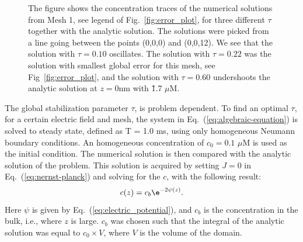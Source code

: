 \begin{figure}[b]
    \begin{minipage}[t]{\leftfigsize}
    \end{minipage}
    \hfill
    \begin{minipage}{\rightfigsize}
      \caption{The figure shows the concentration traces of the numerical solutions from Mesh 1, see legend of Fig.~\ref{fig:error_plot}, for three different $\tau$ together with the analytic solution. The solutions were picked from a line going between the points (0,0,0) and (0,0,12). We see that the solution with $\tau=0.10$ oscillates. The solution with $\tau=0.22$ was the solution with smallest global error for this mesh, see Fig~\ref{fig:error_plot}, and the solution with $\tau=0.60$ undershoots the analytic solution at $z=0$nm with \~1.7 $\mu$M.}
      \label{fig:traces_mesh_1}
    \end{minipage}
\end{figure}

The global stabilization parameter $\tau$, is problem dependent. To find an optimal $\tau$, for a certain electric field and mesh, the system in Eq.~(\ref{eq:algebraic-equation}) is solved to steady state, defined as T = 1.0 ms, using only homogeneous Neumann boundary conditions. An homogeneous concentration of $c_0=0.1$ $\mu$M is used as the initial condition. The numerical solution is then compared with the analytic solution of the problem. This solution is acquired by setting $J=0$ in Eq.~(\ref{eq:nernst-planck}) and solving for the $c$, with the following result:
\begin{equation}
  \label{eq:analytic-solution}
  c(z) = c_b\e^{-2\psi(z)}.
\end{equation}
Here $\psi$ is given by Eq.~(\ref{eq:electric_potential}), and $c_b$ is the concentration in the bulk, i.e., where $z$ is large. $c_b$ was chosen such that the integral of the analytic solution was equal to $c_0\times V$, where $V$ is the volume of the domain.\par

